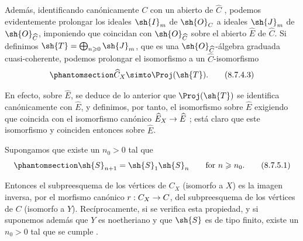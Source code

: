 \documentclass[oneside,10pt]{amsart}
\makeatletter
\renewcommand{\geq}{\geqslant}
\newcommand{\ega@arrow}[2]{\mathchoice{#1}{#2}{#2}{#2}}
\renewcommand{\to}{\ega@arrow{\longrightarrow}{\rightarrow}}
\let\EGAOriginalLabel\label
\renewcommand{\label}[1]{\phantomsection\EGAOriginalLabel{#1}}
\makeatother
\begin{document}
\begin{remark}[8.7.4]
\begin{enumerate}
    Además, identificando canónicamente $C$ con un abierto de $\widehat{C}$ , podemos evidentemente prolongar los ideales $\sh{I}_m$ de $\sh{O}_C$ a ideales $\sh{J}_m$ de $\sh{O}_{\widehat{C}}$, imponiendo que coincidan con $\sh{O}_{\widehat{C}}$ sobre el abierto $\widehat{E}$ de $\widehat{C}$.
    Si definimos $\sh{T}=\bigoplus_{n\geq 0}\sh{J}_m$, que es una $\sh{O}_{\widehat{C}}$-álgebra graduada cuasi-coherente, podemos prolongar el isomorfismo  a un $\widehat{C}$-isomorfismo
    \[
    \label{II.8.7.4.3}
      \widehat{C}_X \simto \Proj(\sh{T}).
    \tag{8.7.4.3}
    \]

    En efecto, sobre $\widehat{E}$, se deduce de lo anterior que $\Proj(\sh{T})$ se identifica canónicamente con $\widehat{E}$, y definimos, por tanto, el isomorfismo  sobre $\widehat{E}$ exigiendo que coincida con el isomorfismo canónico $\widehat{E}_X\to\widehat{E}$ ;
    está claro que este isomorfismo y  coinciden entonces sobre $\widehat{E}$.
\end{enumerate}
\end{remark}
\begin{corollary}[8.7.5]
\label{II.8.7.5}
Supongamos que existe un $n_0>0$ tal que
\[
\label{II.8.7.5.1}
  \sh{S}_{n+1} = \sh{S}_1\sh{S}_n
  \qquad
  \text{for }n\geq n_0.
\tag{8.7.5.1}
\]

Entonces el subpreesquema de los vértices de $C_X$ (isomorfo a $X$) es la imagen inversa, por el morfismo canónico $r:C_X\to C$, del subpreesquema de los vértices de $C$ (isomorfo a $Y$).
Recíprocamente, si se verifica esta propiedad, y si suponemos además que $Y$ es noetheriano y que $\sh{S}$ es de tipo finito, existe un $n_0>0$ tal que se cumple .
\end{corollary}
\end{document}
